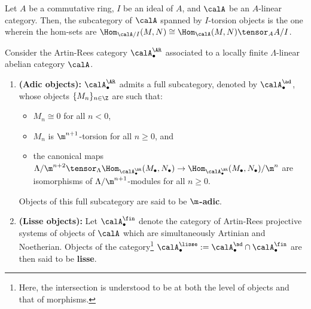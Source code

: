             \begin{definition} \label{def: torsion_objects_in_tensor_categories}
                Let $A$ be a commutative ring, $I$ be an ideal of $A$, and $\calA$ be an $A$-linear category. Then, the subcategory of $\calA$ spanned by $I$-torsion objects is the one wherein the hom-sets are $\Hom_{\calA/I}(M, N) \cong \Hom_\calA(M, N) \tensor_A A/I$.
            \end{definition}
            \begin{definition} \label{def: adic_objects_and_lisse_objects_of_artin_rees_categories}
                Consider the Artin-Rees category $\calA_{\bullet}^{\AR}$ associated to a locally finite $\Lambda$-linear abelian category $\calA$. 
                    \begin{enumerate}
                        \item \textbf{(Adic objects):} $\calA_{\bullet}^{\AR}$ admits a full subcategory, denoted by $\calA_{\bullet}^{\ad}$, whose objects $\{M_n\}_{n \in \Z}$ are such that:
                            \begin{itemize}
                                \item $M_n \cong 0$ for all $n < 0$,
                                \item $M_n$ is $\m^{n + 1}$-torsion for all $n \geq 0$, and
                                \item the canonical maps $\Lambda/\m^{n + 2} \tensor_{\Lambda} \Hom_{\calA_{\bullet}^{\AR}}(M_{\bullet}, N_{\bullet}) \to \Hom_{\calA_{\bullet}^{\AR}}(M_{\bullet}, N_{\bullet})/\m^n$ are isomorphisms of $\Lambda/\m^{n + 1}$-modules for all $n \geq 0$.
                            \end{itemize}
                        Objects of this full subcategory are said to be \textbf{$\m$-adic}.
                        \item \textbf{(Lisse objects):} Let $\calA_{\bullet}^{\fin}$ denote the category of Artin-Rees projective systems of objects of $\calA$ which are simultaneously Artinian and Noetherian. Objects of the category\footnote{Here, the intersection is understood to be at both the level of objects and that of morphisms.} $\calA_{\bullet}^{\lisse} := \calA_{\bullet}^{\ad} \cap \calA_{\bullet}^{\fin}$ are then said to be \textbf{lisse}. 
                    \end{enumerate}
            \end{definition}
